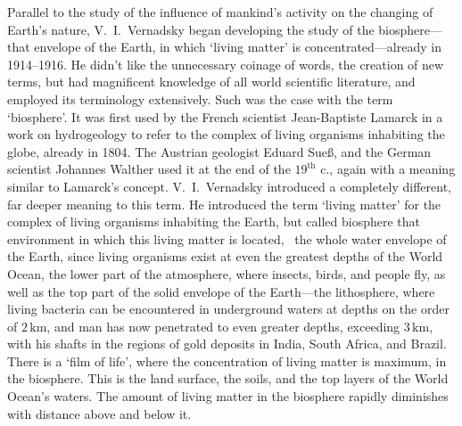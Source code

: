 Parallel to the study of the influence of mankind's activity on the changing of
Earth's nature, V.~I.\ Vernadsky began developing the study of the
biosphere---that envelope of the Earth, in which `living matter' is
concentrated---already in 1914--1916.  He didn't like the unnecessary coinage
of words, the creation of new terms, but had magnificent knowledge of all world
scientific literature, and employed its terminology extensively.  Such was the
case with the term `biosphere'.  It was first used by the French scientist
Jean-Baptiste Lamarck in a work on hydrogeology to refer to the complex of living organisms
inhabiting the globe, already in 1804.  The Austrian geologist Eduard Sueß, and the German
scientist Johannes Walther used it at the end of the
$19^\mathrm{th}$ c., again with a meaning similar to Lamarck's concept.  V.~I.\ 
Vernadsky introduced a completely different, far deeper meaning to this term.
He introduced the term `living matter' for the complex of living organisms
inhabiting the Earth, but called biosphere that environment in which this
living matter is located, \ie\ the whole water envelope of the Earth, since
living organisms exist at even the greatest depths of the World Ocean, the
lower part of the atmosphere, where insects, birds, and people fly, as well as
the top part of the solid envelope of the Earth---the lithosphere, where living
bacteria can be encountered in underground waters at depths on the order of
$2\,\mathrm{km}$, and man has now penetrated to even greater depths, exceeding
$3\,\mathrm{km}$, with his shafts in the regions of gold deposits in India,
South Africa, and Brazil.  There is a `film of life',
where the concentration of living matter is maximum, in the biosphere.  This is
the land surface, the soils, and the top layers of the World Ocean's waters.
The amount of living matter in the biosphere rapidly diminishes with distance
above and below it.

